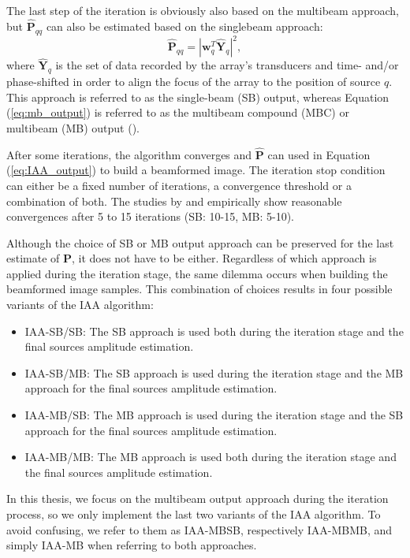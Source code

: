 The last step of the iteration is obviously also based on the multibeam approach, but $\boldsymbol{\hat{P}}_{qq}$ can also be estimated based on the singlebeam approach:
\begin{equation}
    \boldsymbol{\hat{P}}_{qq} = |\boldsymbol{w}_q^T \boldsymbol{\hat{Y}}_q |^2,
\label{eq:sb_output}
\end{equation}
\noindent
where $\boldsymbol{\hat{Y}}_q$ is the set of data recorded by the array's transducers and time- and/or phase-shifted in order to align the focus of the array to the position of source $q$. This approach is referred to as the single-beam (SB) output, whereas Equation (\ref{eq:mb_output}) is referred to as the multibeam compound (MBC) or multibeam (MB) output (\cite{Jensen_multibeam, Jensen_IAA}).

After some iterations, the algorithm converges and $\boldsymbol{\hat{P}}$ can used in Equation (\ref{eq:IAA_output}) to build a beamformed image.
The iteration stop condition can either be a fixed number of iterations, a convergence threshold or a combination of both.
The studies by \cite{Yardibi_nonparametric_IAA} and \cite{Jensen_IAA} empirically show reasonable convergences after 5 to 15 iterations (SB: 10-15, MB: 5-10).

Although the choice of SB or MB output approach can be preserved for the last estimate of $\boldsymbol{P}$, it does not have to be either. Regardless of which approach is applied during the iteration stage, the same dilemma occurs when building the beamformed image samples. This combination of choices results in four possible variants of the IAA algorithm:
\begin{itemize}
    \item IAA-SB/SB: The SB approach is used both during the iteration stage and the final sources amplitude estimation.
    \item IAA-SB/MB: The SB approach is used during the iteration stage and the MB approach for the final sources amplitude estimation.
    \item IAA-MB/SB: The MB approach is used during the iteration stage and the SB approach for the final sources amplitude estimation.
    \item IAA-MB/MB: The MB approach is used both during the iteration stage and the final sources amplitude estimation.
\end{itemize}
\noindent
In this thesis, we focus on the multibeam output approach during the iteration process, so we only implement the last two variants of the IAA algorithm.
To avoid confusing, we refer to them as IAA-MBSB, respectively IAA-MBMB, and simply IAA-MB when referring to both approaches.


